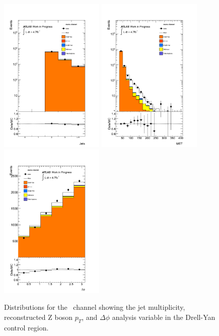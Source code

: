 \begin{figure}[hbtp!]
	 \begin{center}
         \includegraphics[width=50mm]{f/mumu_dy_njet_central_double}
         \includegraphics[width=50mm]{f/mumu_dy_met_central_double}
         \includegraphics[width=50mm]{f/mumu_dy_delta_phi_central_double}
       \end{center}
       \caption{Distributions for the \mumu\ channel showing the jet multiplicity, reconstructed Z boson $p_{T}$, and $\Delta\phi$ analysis variable in the Drell-Yan control region.}
     \label{fig:mumu_control_dy}
\end{figure}
    
